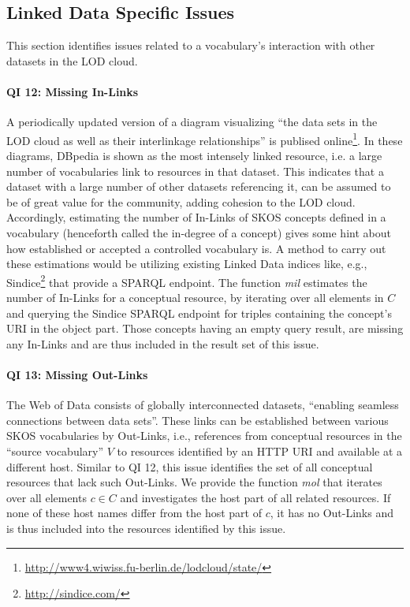 
\subsection{Linked Data Specific Issues}

This section identifies issues related to a vocabulary's interaction with other datasets in the LOD cloud.

\paragraph{QI 12: Missing In-Links}
A periodically updated version of a diagram visualizing ``the data sets in the LOD cloud as well as their interlinkage relationships'' is publised online\footnote{\url{http://www4.wiwiss.fu-berlin.de/lodcloud/state/}}. In these diagrams, DBpedia is shown as the most intensely linked resource, i.e. a large number of vocabularies link to resources in that dataset. This indicates that a dataset with a large number of other datasets referencing it, can be assumed to be of great value for the community, adding cohesion to the LOD cloud. Accordingly, estimating the number of In-Links of SKOS concepts defined in a vocabulary (henceforth called the in-degree of a concept) gives some hint about how established or accepted a controlled vocabulary is. A method to carry out these estimations would be utilizing existing Linked Data indices like, e.g., Sindice\footnote{\url{http://sindice.com/}} that provide a SPARQL endpoint. 
The function \textit{mil} estimates the number of In-Links for a conceptual resource, by iterating over all elements in $C$ and querying the Sindice SPARQL endpoint for triples containing the concept's URI in the object part. Those concepts having an empty query result, are missing any In-Links and are thus included in the result set of this issue.

\paragraph{QI 13: Missing Out-Links}
The Web of Data consists of globally interconnected datasets, ``enabling seamless connections between data sets''\cite{Heath2011}. These links can be established between various SKOS vocabularies by Out-Links, i.e., references from conceptual resources in the ``source vocabulary'' $V$ to resources identified by an HTTP URI and available at a different host. Similar to QI 12, this issue identifies the set of all conceptual resources that lack such Out-Links. 
We provide the function \textit{mol} that iterates over all elements $c \in C$ and investigates the host part of all related resources. If none of these host names differ from the host part of $c$, it has no Out-Links and is thus included into the resources identified by this issue.


